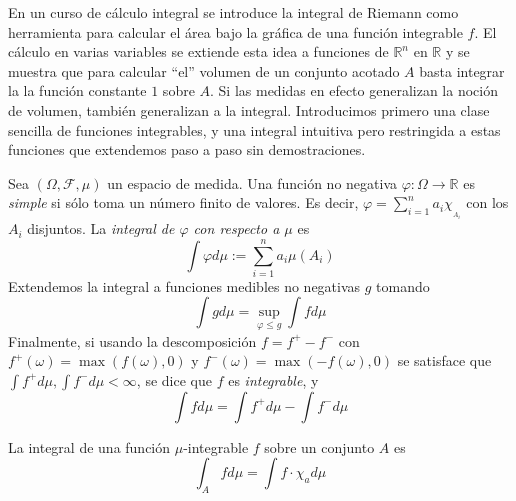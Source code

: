\documentclass[main.tex]{subfiles}
\begin{document}
En un curso de cálculo integral se introduce la integral de Riemann como herramienta para calcular el área bajo la gráfica de una función integrable $f$. El cálculo en varias variables se extiende esta idea a funciones de $\mathbb{R}^n$ en $\mathbb{R}$ y se muestra que para calcular \enquote{el} volumen de un conjunto acotado $A$ basta integrar la la función constante $1$ sobre $A$. Si las medidas en efecto generalizan la noción de volumen, también generalizan a la integral. Introducimos primero una clase sencilla de funciones integrables, y una integral intuitiva pero restringida a estas funciones que extendemos paso a paso sin demostraciones.

\begin{definition}\label{def:int}
Sea $(\Omega, \mathcal{F}, \mu)$ un espacio de medida. Una función no negativa $\varphi:\Omega\to\mathbb{R}$ es \textit{simple} si sólo toma un número finito de valores. Es decir, $\varphi=\sum_{i=1}^na_i\chi_{_{A_i}}$ con los $A_i$ disjuntos. La \textit{integral de $\varphi$ con respecto a $\mu$} es
\begin{equation*}
	\int\varphi d\mu := \sum_{i=1}^n a_i\mu(A_i)
\end{equation*}
Extendemos la integral a funciones medibles no negativas $g$ tomando
\begin{equation*}
	\int g d\mu = \sup_{\varphi \leq g}\int fd\mu
\end{equation*}
 Finalmente, si usando la descomposición $f=f^+ -f^-$ con $f^+(\omega)=\max\left(f(\omega), 0\right)$ y $f^-(\omega)=\max\left(-f(\omega), 0\right)$ se satisface que $\int f^+d\mu, \int f^-d\mu < \infty$, se dice que $f$ es \textit{integrable}, y
 \begin{equation*}
 \int f d\mu = 	\int f^+d\mu - \int f^-d\mu
 \end{equation*}
\end{definition}

\begin{definition}
	La integral de una función $\mu$-integrable $f$ sobre un conjunto $A$ es
	\begin{equation*}
	\int_A fd\mu = \int f\cdot\chi_a d\mu	
	\end{equation*}
\end{definition}
\end{document}
